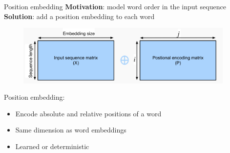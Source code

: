 \documentclass[usenames,dvipsnames,notes,11pt,aspectratio=169,hyperref={colorlinks=true, linkcolor=blue}]{beamer}
\begin{document}
\begin{frame}
    {Position embedding}
    \textbf{Motivation}: model word order in the input sequence\\
    \textbf{Solution}: add a position embedding to each word
    \begin{figure}
        \includegraphics[height=3cm]{figures/position-embedding}
    \end{figure}

    Position embedding:\\
    \begin{itemize}
        \item Encode absolute and relative positions of a word
        \item Same dimension as word embeddings
        \item Learned or deterministic 
    \end{itemize}
\end{frame}
\end{document}
